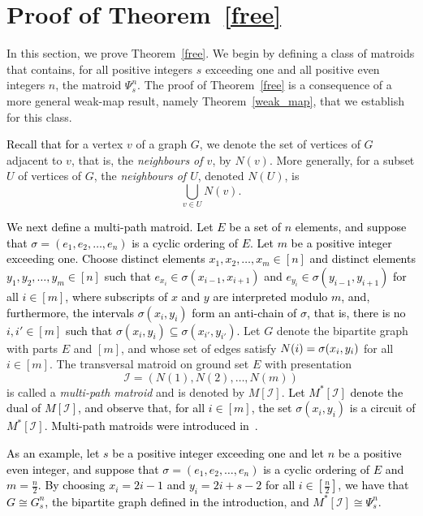 \documentclass[11pt]{amsart}
\newcommand{\blue}{\textcolor{black}}
\newcommand{\bloo}{\textcolor{black}}
\begin{document}
\section{Proof of Theorem~\ref{free}}
\label{freethm}

In this section, we prove Theorem~\ref{free}. We begin by defining a class of matroids that contains, for all positive integers $s$ exceeding one and all positive even integers $n$, the matroid $\Psi^n_s$. The proof of Theorem~\ref{free} is a consequence of a more general weak-map result, namely Theorem~\ref{weak_map}, that we establish for this class.

\blue{Recall that for} a vertex $v$ of a graph $G$, we denote the set of vertices of $G$ adjacent to $v$, that is, the {\em neighbours of $v$}, by $N(v)$. More generally, for a subset $U$ of vertices of $G$, the {\em neighbours of $U$}, denoted $N(U)$, is
$$\bigcup_{v\in U} N(v).$$

\bloo{We next define a multi-path matroid. Let $E$ be a set of $n$ elements, and suppose that $\sigma=(e_1,e_2,\ldots,e_n)$ is a cyclic ordering of $E$. Let $m$ be a positive integer \bloo{exceeding one}. Choose distinct elements $x_1, x_2, \ldots, x_m \in [n]$ and distinct elements $y_1,y_2,\ldots,y_m \in [n]$ such that $e_{x_i} \in \sigma(x_{i-1},x_{i+1})$ and $e_{y_i} \in \sigma(y_{i-1},y_{i+1})$ for all $i \in [m]$, where subscripts  \bloo{of $x$ and $y$} are interpreted modulo $m$, and, furthermore, the intervals $\sigma(x_i,y_i)$ form an anti-chain of $\sigma$, that is, there is no $i, i' \in [m]$ such that $\sigma(x_i,y_i) \subseteq \sigma(x_{i'},y_{i'})$.} Let $G$ denote the bipartite graph with parts $E$ and $[m]$, and whose set of edges satisfy $\bloo{N(i)} = \sigma(x_i, y_i)$ for all $i \in [m]$. The transversal matroid on ground set $E$ with presentation
$$\mathscr I=(N(1), N(2), \ldots, N(m))$$
is called a {\em multi-path matroid} and is denoted by $M[\mathscr I]$. \blue{Let $M^*[\mathscr I]$ denote the dual of $M[\mathscr I]$, and observe that, for all $i\in [m]$, the set $\sigma(x_i, y_i)$ is a circuit of $M^*[\mathscr I]$. Multi-path matroids were introduced in~\cite{bon07}.}

\blue{As an example, let $s$ be a positive integer exceeding one and let $n$ be a positive even integer, and suppose that $\sigma=(e_1, e_2, \ldots, e_n)$ is a cyclic ordering of $E$ and $m=\frac{n}{2}$. By choosing \bloo{$x_i=2i-1$ and $y_i=2i+s-2$} for all $i\in \left[\frac{n}{2}\right]$, we have that $G\cong G^n_s$, the bipartite graph defined in the introduction, and $M^*[\mathscr I] \cong \Psi^n_s$.}
\end{document}
